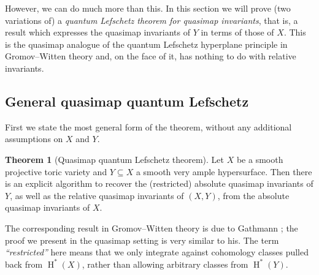 \documentclass[10pt]{amsart}
\newcommand{\HH}{\operatorname{H}}
\theoremstyle{definition}
\newtheorem{thm}{Theorem}[section]
\theoremstyle{definition}
\begin{document}
However, we can do much more than this. In this section we will prove (two variations of) a \emph{quantum Lefschetz theorem for quasimap invariants}, that is, a result which expresses the quasimap invariants of $Y$ in terms of those of $X$. This is the quasimap analogue of the quantum Lefschetz hyperplane principle in Gromov--Witten theory and, on the face of it, has nothing to do with relative invariants.

\subsection{General quasimap quantum Lefschetz}\label{Subsection general quasimap Lefschetz}
First we state the most general form of the theorem, without any additional assumptions on $X$ and $Y$.
\begin{thm}[Quasimap quantum Lefschetz theorem] \label{Theorem full quasimap Lefschetz} Let $X$ be a smooth projective toric variety and $Y \subseteq X$ a smooth very ample hypersurface. Then there is an explicit algorithm to recover the (restricted) absolute quasimap invariants of $Y$, as well as the relative quasimap invariants of $(X,Y)$, from the absolute quasimap invariants of $X$.\end{thm}
The corresponding result in Gromov--Witten theory is due to Gathmann \cite[Corollary 2.5.6]{GathmannThesis}; the proof we present in the quasimap setting is very similar to his. The term \emph{``restricted''} here means that we only integrate against cohomology classes pulled back from $\HH^*(X)$, rather than allowing arbitrary classes from $\HH^*(Y)$.
\end{document}
